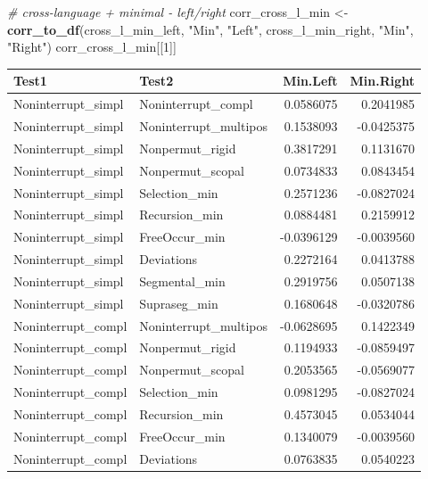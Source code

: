 \documentclass[
]{article}
\newenvironment{Shaded}{\begin{snugshade}}{\end{snugshade}}
\newcommand{\CommentTok}[1]{\textcolor[rgb]{0.56,0.35,0.01}{\textit{#1}}}
\newcommand{\DecValTok}[1]{\textcolor[rgb]{0.00,0.00,0.81}{#1}}
\newcommand{\FunctionTok}[1]{\textcolor[rgb]{0.13,0.29,0.53}{\textbf{#1}}}
\newcommand{\NormalTok}[1]{#1}
\newcommand{\OtherTok}[1]{\textcolor[rgb]{0.56,0.35,0.01}{#1}}
\newcommand{\StringTok}[1]{\textcolor[rgb]{0.31,0.60,0.02}{#1}}
\begin{document}
\begin{Shaded}
\begin{Highlighting}[]
\CommentTok{\# cross{-}language + minimal {-} left/right}
\NormalTok{corr\_cross\_l\_min }\OtherTok{\textless{}{-}} \FunctionTok{corr\_to\_df}\NormalTok{(cross\_l\_min\_left, }\StringTok{"Min"}\NormalTok{, }\StringTok{"Left"}\NormalTok{, cross\_l\_min\_right, }\StringTok{"Min"}\NormalTok{, }\StringTok{"Right"}\NormalTok{)}
\NormalTok{corr\_cross\_l\_min[[}\DecValTok{1}\NormalTok{]]}
\end{Highlighting}
\end{Shaded}

\begin{longtable}[]{@{}llrr@{}}
\toprule\noalign{}
Test1 & Test2 & Min.Left & Min.Right \\
\midrule\noalign{}
\endhead
\bottomrule\noalign{}
\endlastfoot
Noninterrupt\_simpl & Noninterrupt\_compl & 0.0586075 & 0.2041985 \\
Noninterrupt\_simpl & Noninterrupt\_multipos & 0.1538093 & -0.0425375 \\
Noninterrupt\_simpl & Nonpermut\_rigid & 0.3817291 & 0.1131670 \\
Noninterrupt\_simpl & Nonpermut\_scopal & 0.0734833 & 0.0843454 \\
Noninterrupt\_simpl & Selection\_min & 0.2571236 & -0.0827024 \\
Noninterrupt\_simpl & Recursion\_min & 0.0884481 & 0.2159912 \\
Noninterrupt\_simpl & FreeOccur\_min & -0.0396129 & -0.0039560 \\
Noninterrupt\_simpl & Deviations & 0.2272164 & 0.0413788 \\
Noninterrupt\_simpl & Segmental\_min & 0.2919756 & 0.0507138 \\
Noninterrupt\_simpl & Supraseg\_min & 0.1680648 & -0.0320786 \\
Noninterrupt\_compl & Noninterrupt\_multipos & -0.0628695 & 0.1422349 \\
Noninterrupt\_compl & Nonpermut\_rigid & 0.1194933 & -0.0859497 \\
Noninterrupt\_compl & Nonpermut\_scopal & 0.2053565 & -0.0569077 \\
Noninterrupt\_compl & Selection\_min & 0.0981295 & -0.0827024 \\
Noninterrupt\_compl & Recursion\_min & 0.4573045 & 0.0534044 \\
Noninterrupt\_compl & FreeOccur\_min & 0.1340079 & -0.0039560 \\
Noninterrupt\_compl & Deviations & 0.0763835 & 0.0540223 \\

\end{longtable}
\end{document}
